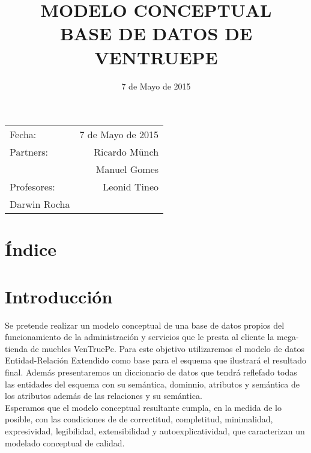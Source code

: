 \documentclass{article}
\title{MODELO CONCEPTUAL \\ BASE DE DATOS DE VENTRUEPE} %
\date{7 de Mayo de 2015} %
\begin{document}
\maketitle %

\begin{center}
\begin{tabular}{l r}
Fecha: & 7 de Mayo de 2015 \\ %
Partners: & Ricardo M\"unch  \\ %
& Manuel Gomes \\
Profesores: & Leonid Tineo \\
Darwin Rocha %
\end{tabular}
\end{center}

\clearpage


\section{\'Indice}



\clearpage

\section{Introducci\'on}


Se pretende realizar un modelo conceptual de una base de datos propios del funcionamiento de la administración y servicios que le presta al cliente la mega-tienda de muebles VenTruePe. Para este objetivo utilizaremos el modelo de datos Entidad-Relaci\'on Extendido como base para el esquema que ilustrar\'a el resultado final. Adem\'as presentaremos un diccionario de datos que tendr\'a reflefado todas las entidades del esquema con su sem\'antica, dominnio, atributos y sem\'antica de los atributos adem\'as de las relaciones y su sem\'antica.
\\

Esperamos que el modelo conceptual resultante cumpla, en la medida de lo posible, con las condiciones de de correctitud, completitud, minimalidad, expresividad, legibilidad, extensibilidad y autoexplicatividad, que caracterizan un modelado conceptual de calidad.
\end{document}
